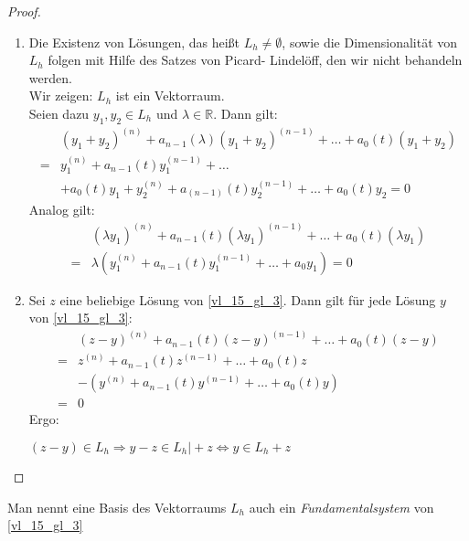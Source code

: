\begin{proof}
	\begin{enumerate}
		\item Die Existenz von Lösungen, das heißt $L_h \neq \emptyset$, sowie 
		die Dimensionalität von $L_h$ folgen mit Hilfe des Satzes von Picard-
		Lindelöff, den wir nicht behandeln werden.\\
		Wir zeigen: $L_h$ ist ein Vektorraum.\\
		Seien dazu $y_1,y_2 \in L_h$ und $\lambda \in \mathbb{R}$.
		Dann gilt:
		\begin{align*}
			& (y_1 + y_2)^{(n)} + a_{n-1}(\lambda)(y_1+y_2)^{(n-1)} + \hdots 	
			+ a_0(t)(y_1 + y_2) \\
			= & y_1^{(n)} + a_{n-1}(t)y_{1}^{(n-1)}+ \hdots \\
			& + a_0(t)y_1 + y_2^{(n)} + a_{(n-1)}(t)y_{2}^{(n-1)} + \hdots + 
			a_0(t)y_2 = 0		
		\end{align*}
		Analog gilt:
		\begin{align*}
			& (\lambda y_1)^{(n)} + a_{n-1}(t)(\lambda y_1)^{(n-1)} + \hdots 
			+ a_0(t)(\lambda y_1) \\ =
			& \lambda(y_1^{(n)}+a_{n-1}(t)y_1^{(n-1)} + \hdots + a_0 y_1) = 0
		\end{align*}
		\item Sei $z$ eine beliebige Lösung von \ref{vl_15_gl_3}. Dann gilt für jede Lösung 
		$y$ von \ref{vl_15_gl_3}:
		\begin{align*}
			& (z-y)^{(n)} + a_{n-1}(t) (z-y)^{(n-1)}+\hdots+a_0(t)(z-y) \\
			= & z^{(n)} + a_{n-1}(t)z^{(n-1)} + \hdots +a_0(t)z \\
			& -\left( y^{(n)} + a_{n-1}(t)y^{(n-1)} + \hdots + a_0(t)y\right) \\
			= & 0
		\end{align*}
		Ergo:
		\begin{center}
		 $(z-y) \in L_h\Rightarrow y-z \in L_h \vert + z \Leftrightarrow y \in L_h + z$
		\end{center}
	\end{enumerate}
\end{proof}

\begin{Definition}{\label{vl_16_def_1}
	Man nennt eine Basis des Vektorraums $L_h$ auch ein \emph{Fundamentalsystem} von 
	\ref{vl_15_gl_3}
}\end{Definition}


